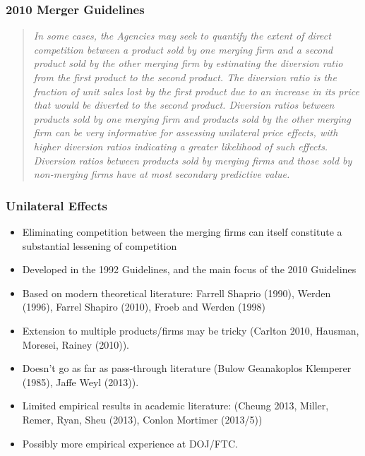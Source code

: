 \documentclass[xcolor=pdftex,dvipsnames,table,mathserif]{beamer}
\begin{document}
\begin{frame}
\frametitle{2010 Merger Guidelines}
\begin{quotation}
\textit{
In some cases, the Agencies may seek to quantify the extent of direct competition between a product sold by one merging firm and a second product sold by the other merging firm by estimating the diversion ratio from the first product to the second product. \alert{The diversion ratio is the fraction of unit sales lost by the first product due to an increase in its price that would be diverted to the second product. }Diversion ratios between products sold by one merging firm and products sold by the other merging firm can be very informative for \alert{assessing unilateral price effects, with higher diversion ratios indicating a greater likelihood of such effects}. Diversion ratios between products sold by merging firms and those sold by non-merging firms have at most secondary predictive value.}
\end{quotation}
\end{frame}

\begin{frame}
\frametitle{Unilateral Effects}
\begin{itemize}
\item Eliminating competition between the merging firms can itself constitute a substantial lessening of competition
\item Developed in the 1992 Guidelines, and the main focus of the 2010 Guidelines
\item Based on modern theoretical literature: Farrell Shaprio (1990), Werden (1996), Farrel Shapiro (2010), Froeb and Werden (1998)
\item Extension to multiple products/firms may be tricky (Carlton 2010, Hausman, Moresei, Rainey (2010)).
\item Doesn't go as far as pass-through literature (Bulow Geanakoplos Klemperer (1985), Jaffe Weyl (2013)). 
\item Limited empirical results in academic literature: (Cheung 2013, Miller, Remer, Ryan, Sheu (2013), Conlon Mortimer (2013/5))
\item Possibly more empirical experience at DOJ/FTC.
\end{itemize} 
\end{frame}
\end{document}
